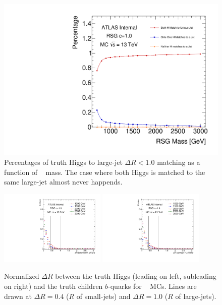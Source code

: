 \begin{figure}[htbp!]
	\begin{center}
	\includegraphics[scale=.48,angle=-90]{figures/boosted/Truth/truth_higgs-matching.pdf}
	\caption{Percentages of truth Higgs to large-\R jet $\Delta R<1.0$ matching as a function of \Grav~ mass. The case where both Higgs is matched to the same large-\R jet almost never happends.}
	\label{fig:truth-Higgs-largeRjet}
\end{center}
\end{figure}

\begin{figure}[htbp!]
\begin{center}
  \includegraphics[width=0.45\textwidth,angle=-90]{figures/boosted/Truth/truth_hbdR.pdf}
  \includegraphics[width=0.45\textwidth,angle=-90]{figures/boosted/Truth/truth_hbdR2.pdf}
\caption{Normalized $\Delta R$ between the truth Higgs (leading on left, subleading on right) and the truth children $b$-quarks for \Grav~ MCs. Lines are drawn at $\Delta R = 0.4$ ($R$ of small-\R jets) and $\Delta R = 1.0$ ($R$ of large-\R jets). }
\label{fig:truth-HbdR}
\end{center}
\end{figure}

